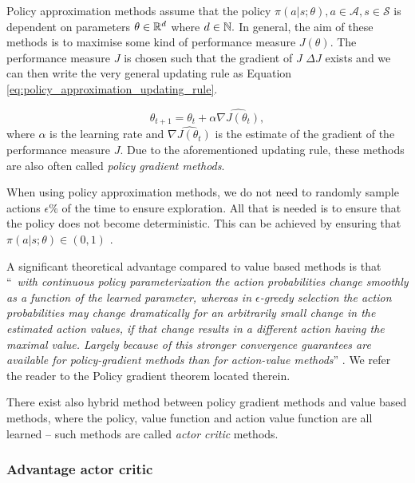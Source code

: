 Policy approximation methods assume that the policy $\pi(a|s;\theta), a \in \mathcal{A}, s \in \mathcal{S}$ is dependent on parameters $\theta \in \mathbb{R}^d$ where $d \in \mathbb{N}.$ In general, the aim of these methods is to maximise some kind of performance measure $J(\theta)$. The performance measure $J$ is chosen such that the gradient of $J$ $\Delta J$ exists and we can then write the very general updating rule as Equation \ref{eq:policy_approximation_updating_rule}.

\begin{equation}
\label{eq:policy_approximation_updating_rule}
\theta_{t+1}=\theta_t+\alpha \widehat{\nabla J(\theta_t)},
\end{equation}
where $\alpha$ is the learning rate and $\widehat{\nabla J(\theta_t)}$ is the estimate of the gradient of the performance measure $J$. Due to the aforementioned updating rule, these methods are also often called \textit{policy gradient methods}. 

\begin{rem} 
When using policy approximation methods, we do not need to randomly sample actions $\epsilon \%$ of the time to ensure exploration. All that is needed is to ensure that the policy does not become deterministic. This can be achieved by ensuring that $\pi(a|s;\theta) \in (0,1)$ \cite[Section 13.1]{sutton2018reinforcement}.
\end{rem}

A significant theoretical advantage compared to value based methods is that “~\textit{with continuous policy parameterization the action probabilities change smoothly as a function of the learned parameter, whereas in $\epsilon$-greedy selection the action probabilities may change dramatically for an arbitrarily small change in the estimated action values, if that change results in a different action having the maximal value. Largely because of this stronger convergence guarantees are available for policy-gradient methods than for action-value methods}” \cite[Section 13.2]{sutton2018reinforcement}. We refer the reader to the Policy gradient theorem located therein.

There exist also hybrid method between policy gradient methods and value based methods, where the policy, value function and action value function are all learned -- such methods are called \textit{actor critic} methods.

\subsubsection{Advantage actor critic}


